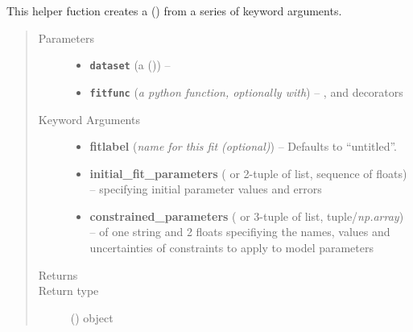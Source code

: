 \documentclass[a4paper,10pt,english]{sphinxmanual}
\begin{document}

\begin{fulllineitems}
\label{index:kafe.fit.build_fit}
This helper fuction creates a {\hyperref[index:kafe.fit.Fit]{\emph{}}} () from a series of
keyword arguments.
\begin{quote}\begin{description}
\item[{Parameters}] \leavevmode\begin{itemize}
\item {} 
\textbf{\texttt{dataset}} (a  {\hyperref[index:kafe.dataset.Dataset]{\emph{}}} ()) -- 

\item {} 
\textbf{\texttt{fitfunc}} (\emph{a python function, optionally with}) -- ,  and  decorators

\end{itemize}

\item[{Keyword Arguments}] \leavevmode\begin{itemize}
\item {} 
\textbf{fitlabel} (\emph{name for this fit (optional)}) --
Defaults to ``untitled''.

\item {} 
\textbf{initial\_fit\_parameters} ( or 2-tuple of list, sequence of floats) --
specifying initial parameter values and errors

\item {} 
\textbf{constrained\_parameters} ( or 3-tuple of list, tuple/\emph{np.array}) --
of one string and 2 floats specifiying the names, values and
uncertainties of constraints to apply to model parameters

\end{itemize}

\item[{Returns}] \leavevmode


\item[{Return type}] \leavevmode
{\hyperref[index:kafe.fit.Fit]{\emph{}}} () object

\end{description}\end{quote}

\end{fulllineitems}
\end{document}
